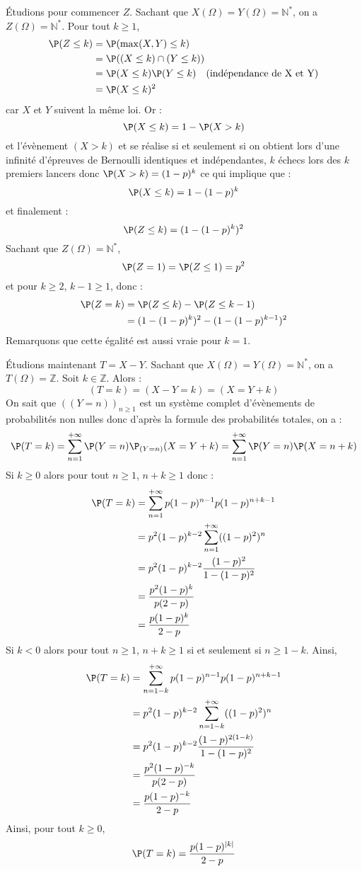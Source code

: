 \documentclass[a4paper,10pt]{report}
\begin{document}
\corr Étudions pour commencer $Z$. Sachant que $X(\Omega)= Y(\Omega)= \mathbb{N}^*$, on a $Z(\Omega)= \mathbb{N}^*$. Pour tout $k \geq 1$,
\begin{align*}
\P(Z \leq k) & = \P( \max(X,Y) \leq k ) \\
& = \P((X \leq k) \cap (Y \leq k)) \\
& = \P(X \leq k) \P(Y \leq k) \quad \hbox{(indépendance de X et Y)}  \\
& = \P(X \leq k)^2
\end{align*}
car $X$ et $Y$ suivent la même loi. Or :
$$ \P(X \leq k) = 1 - \P(X>k)$$
et l'évènement $(X>k)$ et se réalise si et seulement si on obtient lors d'une infinité d'épreuves de Bernoulli identiques et indépendantes, $k$ échecs lors des $k$ premiers lancers donc $\P(X>k) = (1-p)^k$ ce qui implique que :
$$ \P(X \leq k) = 1 - (1-p)^k$$
et finalement :
$$ \P(Z \leq k) = (1-(1-p)^k)^2$$
Sachant que $Z(\Omega) = \mathbb{N}^*$,
$$\P(Z=1) = \P(Z \leq 1) = p^2$$
et pour $k \geq 2$, $k-1 \geq 1$, donc :
\begin{align*}
\P(Z = k ) &= \P(Z \leq k) - \P(Z \leq k-1) \\
& =  (1-(1-p)^k)^2 -  (1-(1-p)^{k-1})^2 
\end{align*}
Remarquons que cette égalité est aussi vraie pour $k=1$.

\medskip

\noindent Étudions maintenant $T=X-Y$. Sachant que $X(\Omega)= Y(\Omega) = \mathbb{N}^*$, on a $T(\Omega)= \mathbb{Z}$. Soit $k \in \mathbb{Z}$. Alors :
$$ (T=k)= (X-Y=k) = (X=Y+k)$$
On sait que $((Y=n))_{n \geq 1}$ est un système complet d'évènements de probabilités non nulles donc d'après la formule des probabilités totales, on a :
$$\P(T=k)  = \sum_{n=1}^{+ \infty} \P(Y=n) \P_{(Y=n)}(X=Y+k) = \sum_{n=1}^{+ \infty} \P(Y=n) \P(X=n+k) $$
Si $k \geq 0$ alors pour tout $n \geq 1$, $n+ k \geq 1$ donc :
\begin{align*}
\P(T=k) & = \sum_{n=1}^{+ \infty} p(1-p)^{n-1} p (1-p)^{n+k-1} \\
& = p^2 (1-p)^{k-2} \sum_{n=1}^{+ \infty} ((1-p)^2)^n \\
& = p^2 (1-p)^{k-2} \dfrac{(1-p)^2}{1-(1-p)^2} \\
& = \dfrac{p^2(1-p)^{k}}{p(2-p)} \\
& = \dfrac{p(1-p)^{k}}{2-p}
\end{align*}
Si $k<0$ alors pour tout $n \geq 1$, $n+k \geq 1$ si et seulement si $n \geq 1-k$. Ainsi,
\begin{align*}
\P(T=k) & = \sum_{n=1-k}^{+ \infty} p(1-p)^{n-1} p (1-p)^{n+k-1} \\
& = p^2 (1-p)^{k-2} \sum_{n=1-k}^{+ \infty} ((1-p)^2)^n \\
& = p^2 (1-p)^{k-2} \dfrac{(1-p)^{2(1-k)}}{1-(1-p)^2} \\
& = \dfrac{p^2(1-p)^{-k}}{p(2-p)} \\
& = \dfrac{p(1-p)^{-k}}{2-p}
\end{align*}
Ainsi, pour tout $k \geq 0$,
$$ \P(T=k) = \dfrac{p(1-p)^{\vert k \vert}}{2-p}$$
\end{document}
